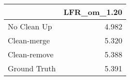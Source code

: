 \begin{tabular}{lr}
\toprule
{} & LFR_om_1.20 \\
\midrule
No Clean Up  &       4.982 \\
Clean-merge  &       5.320 \\
Clean-remove &       5.388 \\
Ground Truth &       5.391 \\
\bottomrule
\end{tabular}
